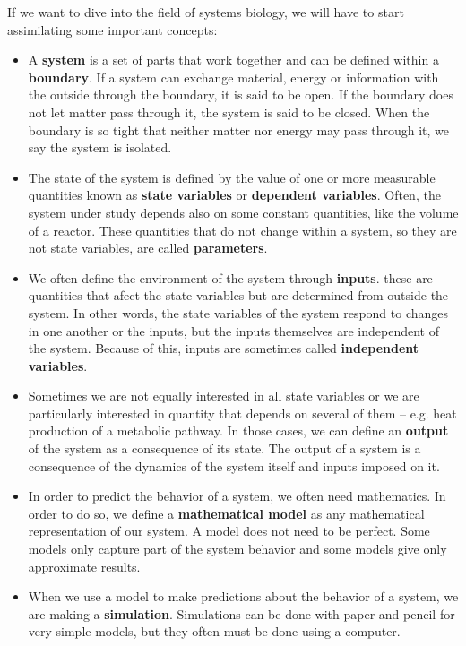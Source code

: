 If we want to dive into the field of systems biology, we will have to start assimilating some important concepts: 
\begin{itemize}
	\item A \textbf{system} is a set of parts that work together and can be defined within a \textbf{boundary}. If a system can exchange material, energy or information with the outside through the boundary, it is said to be open. If the boundary does not let matter pass through it, the system is said to be closed. When the boundary is so tight that neither matter nor energy may pass through it, we say the system is isolated.
	\item The state of the system is defined by the value of one or more measurable quantities known as \textbf{state variables} or \textbf{dependent variables}. Often, the system under study depends also on some constant quantities, like the volume of a reactor. These quantities that do not change within a system, so they are not state variables, are called \textbf{parameters}.
	\item We often define the environment of the system through \textbf{inputs}. these are quantities that afect the state variables but are determined from outside the system. In other words, the state variables of the system respond to changes in one another or the inputs, but the inputs themselves are independent of the system. Because of this, inputs are sometimes called  \textbf{independent variables}.
	\item Sometimes we are not equally interested in all state variables or we are particularly interested in quantity that depends on several of them -- e.g. heat production of a metabolic pathway. In those cases, we can define an \textbf{output} of the system as a consequence of its state. The output of a system is a consequence of the dynamics of the system itself and inputs imposed on it.
	\item In order to predict the behavior of a system, we often need mathematics. In order to do so, we define a \textbf{mathematical model} as any mathematical representation of our system. A model does not need to be perfect. Some models only capture part of the system behavior and some models give only  approximate results.
	\item When we use a model to make predictions about the behavior of a system, we are making a \textbf{simulation}. Simulations can be done with paper and pencil for very simple models, but they often must be done using a computer.
\end{itemize}

